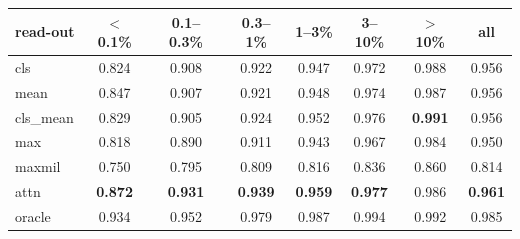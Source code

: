 \begin{tabular}{lccccccc}
\toprule
read-out & $<$0.1\% & 0.1--0.3\% & 0.3--1\% & 1--3\% & 3--10\% & $>$10\% & all \\
\midrule
cls & 0.824 & 0.908 & 0.922 & 0.947 & 0.972 & 0.988 & 0.956 \\
mean & 0.847 & 0.907 & 0.921 & 0.948 & 0.974 & 0.987 & 0.956 \\
cls\_mean & 0.829 & 0.905 & 0.924 & 0.952 & 0.976 & \textbf{0.991} & 0.956 \\
max & 0.818 & 0.890 & 0.911 & 0.943 & 0.967 & 0.984 & 0.950 \\
maxmil & 0.750 & 0.795 & 0.809 & 0.816 & 0.836 & 0.860 & 0.814 \\
attn & \textbf{0.872} & \textbf{0.931} & \textbf{0.939} & \textbf{0.959} & \textbf{0.977} & 0.986 & \textbf{0.961} \\
\midrule
oracle & 0.934 & 0.952 & 0.979 & 0.987 & 0.994 & 0.992 & 0.985 \\
\bottomrule
\end{tabular}
